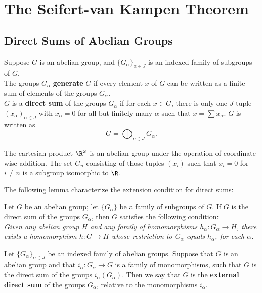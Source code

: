 \newpage

\section{The Seifert-van Kampen Theorem}

\setcounter{subsection}{66}
\subsection{Direct Sums of Abelian Groups}

\begin{definition}
Suppose $G$ is an abelian group, and $\{ G_\alpha \}_{\alpha \in J}$ is an indexed family of subgroups of $G$. \\

The groups $G_\alpha$ \textbf{generate} $G$ if every element $x$ of $G$ can be written as a finite sum of elements of the groups $G_\alpha$. \\

$G$ is a \textbf{direct sum} of the groups $G_\alpha$ if for each $x \in G$, there is only one $J$-tuple $(x_\alpha)_{\alpha \in J}$ with $x_\alpha = 0$ for all 
but finitely many $\alpha$ such that $x = \sum x_\alpha$. $G$ is written as
\[
    G = \bigoplus_{\alpha \in J} G_\alpha.
\]
\end{definition}

\begin{eg}
The cartesian product $\R^\omega$ is an abelian group under the operation of coordinate-wise addition. The set $G_n$ consisting 
of those tuples $(x_i)$ such that $x_i = 0$ for $i \neq n$ is a subgroup isomorphic to $\R$.
\end{eg}

The following lemma characterize the extension condition for direct sums:
\begin{lemma}
Let $G$ be an abelian group; let $\{ G_\alpha \}$ be a family of subgroups of $G$. If $G$ is the direct sum of the groups $G_\alpha$, then
$G$ satisfies the following condition: \\

\textit{Given any abelian group $H$ and any family of homomorphisms $h_\alpha \colon G_\alpha \rightarrow H$, there exists a homomorphism $h\colon G \rightarrow H$ whose restriction
to $G_\alpha$ equals $h_\alpha$, for each $\alpha$.}
\end{lemma}

\begin{definition}
Let $\{ G_\alpha \}_{\alpha \in J}$ be an indexed family of abelian groups. Suppose that $G$ is an abelian group and that $i_\alpha \colon G_\alpha \rightarrow G$ is a family of monomorphisms,
such that $G$ is the direct sum of the groups $i_\alpha(G_\alpha)$. Then we say that $G$ is the \textbf{external direct sum} of the groups $G_\alpha$, relative to the monomorphisms $i_\alpha$. 
\end{definition}

